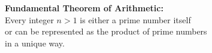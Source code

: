 \documentclass[preview]{standalone}
\begin{document}
\begin{center}
\textbf{Fundamental Theorem of Arithmetic:}\\Every integer $n > 1$ is either a prime number itself\\or can be represented as the product of prime numbers\\in a unique way.
\end{center}
\end{document}
